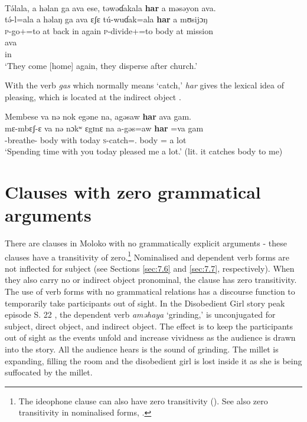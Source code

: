 \ea \label{ex:9:65}
\\
T\'{ə}lala,  a  həlan  ga  ava  ese,  təwəɗakala  \textbf{har}  a  məsəyon  ava.\\
\gll  t\'{ə}-l=ala        a   həlaŋ  ga   ava   ɛʃɛ   t\'{u}-wuɗak=ala   \textbf{har}   a   mʊsijɔŋ\\   
      \textsc{p}-go+{\IFV}=to    at  back  {\ADJ}  in  again  \textsc{p}-divide+{\IFV}=to     body  at  mission\\ 

\medskip
ava\\
in\\
\glt  ‘They come [home] again, they disperse after church.’
\z

With the verb \textit{gas} which normally means ‘catch,’ \textit{har}  gives the lexical idea of pleasing, which is located at the indirect object .

\ea \label{ex:9:66}
Membese  va  nə  nok  egəne  na,  agəsaw  \textbf{har}  ava  gam.\\
\gll  mɛ-mbɛʃ-ɛ     va  nə  nɔkʷ  ɛgɪnɛ  na  a-gəs=aw  \textbf{har}  =va  gam\\
      {\NOM}{}-breathe-{\CL}  body  with  {\twoS}  today  {\PSP}  \textsc{s}-catch={\oneS}.{\IO}  body  {=\PRF}  {a lot}\\
\glt  ‘Spending time with you today pleased me a lot.’ (lit. it catches body to me) 
\z
{}
\largerpage
\section{Clauses with zero grammatical arguments}\label{sec:9.4}
\hypertarget{RefHeading1212781525720847}{}
There are clauses in Moloko with no grammatically explicit arguments - these clauses have a transitivity of zero.\footnote{The ideophone clause can also have zero transitivity %
(). See also zero transitivity in nominalised forms, .} Nominalised and dependent verb forms are not inflected for subject (see Sections \ref{sec:7.6} and \ref{sec:7.7}, respectively). When they also carry no \DO or indirect object pronominal, the clause has zero transitivity. The use of verb forms with no grammatical relations has a discourse function to temporarily take participants out of sight. In the Disobedient Girl story peak episode S. 22 , the dependent verb \textit{aməhaya} ‘grinding,’ is unconjugated for subject, direct object, and indirect object. The effect is to keep the participants out of sight as the events unfold and increase vividness as the audience is drawn into the story. All the audience hears is the sound of grinding. The millet is expanding, filling the room and the disobedient girl is lost inside it as she is being suffocated by the millet.  

